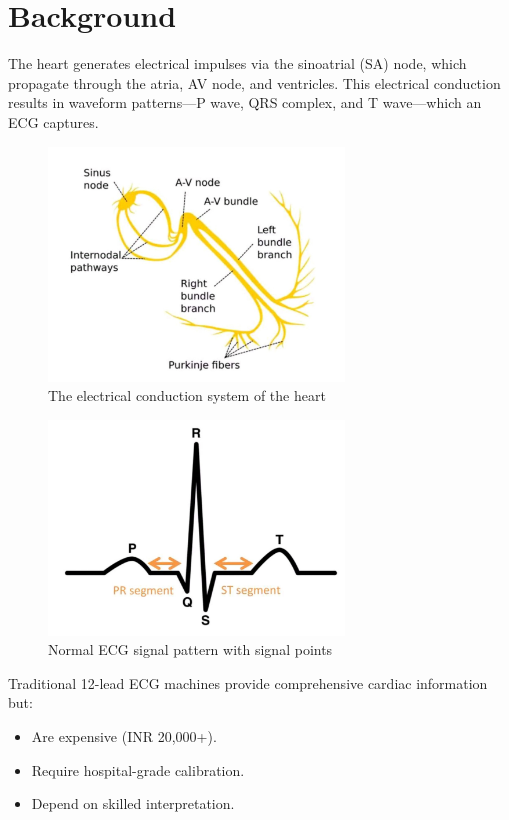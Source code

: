 \chapter{Background}
The heart generates electrical impulses via the sinoatrial (SA) node, which propagate through the atria, AV node, and ventricles. This electrical conduction results in waveform patterns—P wave, QRS complex, and T wave—which an ECG captures.

\begin{figure}[H]
    \centering
    \includegraphics[width=0.7\textwidth]{images/electrical_heart.jpg}
    \caption{The electrical conduction system of the heart}
    \label{fig:electrical_heart}
\end{figure}

\begin{figure}[H]
    \centering
    \includegraphics[width=0.7\textwidth]{images/pqrst.jpg}
    \caption{Normal ECG signal pattern with signal points}
    \label{fig:pqrst}
\end{figure}

Traditional 12-lead ECG machines provide comprehensive cardiac information but:
\begin{itemize}
    \item Are expensive (INR 20,000+).
    \item Require hospital-grade calibration.
    \item Depend on skilled interpretation.
\end{itemize}

